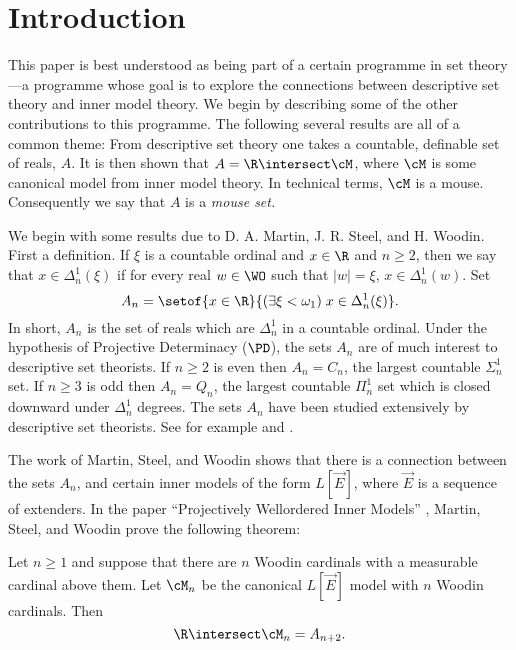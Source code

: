 
\skipbig

\section{Introduction}

\label{section:intro}

 This paper is best understood as being part of
a certain programme in set theory---a
programme whose goal is to explore the connections between descriptive
set theory and inner model theory. We begin by describing some
of the other contributions to this programme. The following several
results are all of a common theme:  From descriptive set theory one
takes a countable, definable set of reals, $A$. It is then shown that
$A=\R\intersect\cM$, where $\cM$ is some canonical model from inner
model theory. In technical terms, $\cM$ is a mouse. Consequently we
say that $A$ is a \emph{mouse set.}

We begin with some results due to D. A. Martin, J. R. Steel, and
H. Woodin. First a definition.
If $\xi$ is a countable ordinal and $x\in\R$  and $n\geq2$, then  we say
that
$x\in\Delta^1_n(\xi)$ if for every real $w\in\WO$ such that $|w|=\xi$,
$x\in\Delta^1_n(w)$. Set
$$A_n = \setof{x\in\R}{(\exists\xi<\omega_1)\; x\in\Delta^1_n(\xi)}.$$
In short, $A_n$ is the set of reals which are $\Delta^1_n$
in a countable ordinal.
Under the hypothesis of Projective Determinacy ($\PD$),
the sets $A_n$ are of
much interest to descriptive set theorists.
If $n\geq2$ is even then $A_n = C_n$, the largest
countable $\Sigma^1_n$ set. If $n\geq3$ is odd then
$A_n=Q_n$, the largest countable $\Pi^1_n$ set which is closed downward
under
$\Delta^1_n$ degrees. The sets $A_n$ have been studied extensively by
descriptive set theorists. See for example \cite{Kechris1} and
\cite{Q_Theory}.

The work of Martin, Steel, and Woodin shows that there is a connection
between the sets $A_n$, and certain inner models of the form
$L[\vec{E}]$, where $\vec{E}$ is a sequence of extenders.
In the paper ``Projectively Wellordered Inner Models''
\cite{Proj_WO_In_Mod}, Martin,
Steel, and Woodin
prove the following theorem:

\begin{theorem}
\label{FirstThm}
Let $n\geq1$ and suppose that there are $n$ Woodin
cardinals with a measurable cardinal above them. Let
$\cM_n$ be the canonical $L[\vec{E}]$ model with $n$ Woodin cardinals. Then
$$\R\intersect\cM_n=A_{n+2}.$$
\end{theorem}


